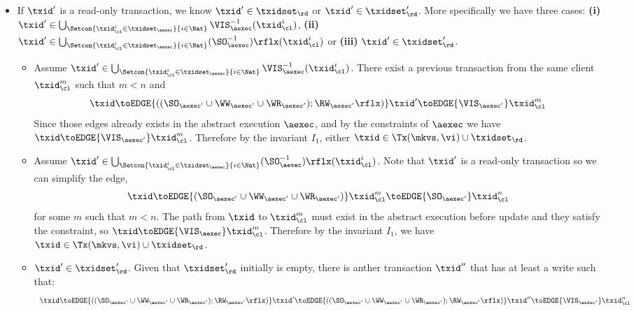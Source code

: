 \begin{itemize}
\begin{itemize}
\item If \( \txid' \) is a read-only transaction, we know \( \txid' \in \txidset_\rd \) or \( \txid' \in \txidset'_\rd \).
    More specifically we have three cases: \textbf{(i)} \( \txid' \in \bigcup_{\Setcon{\txid_{\cl}^{i} \in \txidset_{\aexec} }{ i \in \Nat }} \VIS_{\aexec}^{-1}(\txid^i_\cl) \), \textbf{(ii)} \( \txid' \in \bigcup_{\Setcon{\txid_{\cl}^{i} \in \txidset_{\aexec} }{ i \in \Nat }} (\SO_{\aexec}^{-1})\rflx(\txid^i_\cl) \) or \textbf{(iii)} \( \txid' \in \txidset'_\rd\).
    \begin{itemize}
        \item Assume \( \txid' \in \bigcup_{\Setcon{\txid_{\cl}^{i} \in \txidset_{\aexec} }{ i \in \Nat }} \VIS_{\aexec}^{-1}(\txid^i_\cl) \).
        There exist a previous transaction from the same client \( \txid_\cl^m\) such that \( m < n \) and 
        \[ 
            \txid \toEDGE{\left( (\SO_{\aexec'} \cup \WW_{\aexec'} \cup \WR_{\aexec'} ) ; \RW_{\aexec'}\rflx \right) } \txid' \toEDGE{\VIS_{\aexec'}}  \txid_\cl^m 
        \]
        Since those edges already exists in the abstract execution \( \aexec\), and by the constraints of \( \aexec \) we have \( \txid \toEDGE{\VIS_{\aexec'}} \txid_\cl^m\).
        Therefore by the invariant \( I_1 \), either \( \txid \in \Tx(\mkvs, \vi) \cup \txidset_\rd \).
    \item Assume \( \txid' \in \bigcup_{\Setcon{\txid_{\cl}^{i} \in \txidset_{\aexec} }{ i \in \Nat }} (\SO_{\aexec}^{-1})\rflx(\txid^i_\cl) \).
        Note that  \( \txid' \) is a read-only transaction so we can simplify the edge,
        \[ 
            \txid \toEDGE{\left( \SO_{\aexec'} \cup \WW_{\aexec'} \cup \WR_{\aexec'}  \right)} \txid_\cl^m \toEDGE{\SO_{\aexec'}}  \txid_\cl^n 
        \] 
        for some \( m \) such that \( m < n \).
        The path from \( \txid \) to \( \txid_\cl^m \) must exist in the abstract execution before update and they satisfy the constraint, so \( \txid \toEDGE{\VIS_\aexec} \txid_\cl^m \).
        Therefore by the invariant \( I_1 \), we have \( \txid \in \Tx(\mkvs, \vi) \cup \txidset_\rd \).
    \item \( \txid' \in \txidset'_\rd \). 
        Given that \( \txidset'_\rd \) initially is empty, there is anther transaction \( \txid'' \) that has at least a write such that:
        \[
        \begin{array}{l}
            \txid \toEDGE{\left( (\SO_{\aexec'} \cup \WW_{\aexec'} \cup \WR_{\aexec'} ) ; \RW_{\aexec'}\rflx \right) }
            \txid' \toEDGE{\left( (\SO_{\aexec'} \cup \WW_{\aexec'} \cup \WR_{\aexec'} ) ; \RW_{\aexec'}\rflx \right) } \txid'' \toEDGE{\VIS_{\aexec'}}  \txid_\cl^n 

\end{array}\]
\end{itemize}
\end{itemize}
\end{itemize}
